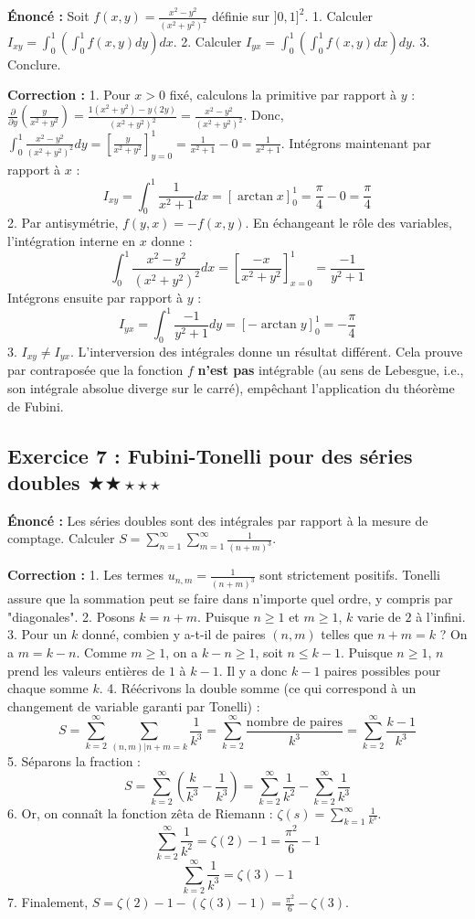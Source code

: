 \documentclass[11pt,a4paper]{article}
\begin{document}
\textbf{Énoncé :}
Soit $f(x, y) = \frac{x^2 - y^2}{(x^2 + y^2)^2}$ définie sur $]0, 1]^2$.
1. Calculer $I_{xy} = \int_0^1 \left( \int_0^1 f(x, y) dy \right) dx$.
2. Calculer $I_{yx} = \int_0^1 \left( \int_0^1 f(x, y) dx \right) dy$.
3. Conclure.

\textbf{Correction :}
1. Pour $x > 0$ fixé, calculons la primitive par rapport \`a $y$ : $\frac{\partial}{\partial y} \left( \frac{y}{x^2+y^2} \right) = \frac{1(x^2+y^2) - y(2y)}{(x^2+y^2)^2} = \frac{x^2-y^2}{(x^2+y^2)^2}$.
   Donc, $\int_0^1 \frac{x^2-y^2}{(x^2+y^2)^2} dy = \left[ \frac{y}{x^2+y^2} \right]_{y=0}^1 = \frac{1}{x^2+1} - 0 = \frac{1}{x^2+1}$.
   Intégrons maintenant par rapport \`a $x$ :
   $$ I_{xy} = \int_0^1 \frac{1}{x^2+1} dx = [\arctan x]_0^1 = \frac{\pi}{4} - 0 = \frac{\pi}{4} $$
2. Par antisymétrie, $f(y, x) = -f(x, y)$. En échangeant le rôle des variables, l'intégration interne en $x$ donne :
   $$ \int_0^1 \frac{x^2-y^2}{(x^2+y^2)^2} dx = \left[ \frac{-x}{x^2+y^2} \right]_{x=0}^1 = \frac{-1}{y^2+1} $$
   Intégrons ensuite par rapport \`a $y$ :
   $$ I_{yx} = \int_0^1 \frac{-1}{y^2+1} dy = [-\arctan y]_0^1 = -\frac{\pi}{4} $$
3. $I_{xy} \neq I_{yx}$. L'interversion des intégrales donne un résultat différent. Cela prouve par contraposée que la fonction $f$ \textbf{n'est pas} intégrable (au sens de Lebesgue, i.e., son intégrale absolue diverge sur le carré), empêchant l'application du théorème de Fubini.


\subsection*{Exercice 7 : Fubini-Tonelli pour des séries doubles \quad $\bigstar\bigstar\star\star\star$}

\textbf{Énoncé :}
Les séries doubles sont des intégrales par rapport \`a la mesure de comptage.
Calculer $S = \sum_{n=1}^\infty \sum_{m=1}^\infty \frac{1}{(n+m)^3}$.

\textbf{Correction :}
1. Les termes $u_{n,m} = \frac{1}{(n+m)^3}$ sont strictement positifs. Tonelli assure que la sommation peut se faire dans n'importe quel ordre, y compris par "diagonales".
2. Posons $k = n + m$. Puisque $n \ge 1$ et $m \ge 1$, $k$ varie de $2$ \`a l'infini.
3. Pour un $k$ donné, combien y a-t-il de paires $(n, m)$ telles que $n+m = k$ ?
   On a $m = k - n$. Comme $m \ge 1$, on a $k - n \ge 1$, soit $n \le k - 1$.
   Puisque $n \ge 1$, $n$ prend les valeurs entières de $1$ \`a $k-1$.
   Il y a donc $k - 1$ paires possibles pour chaque somme $k$.
4. Réécrivons la double somme (ce qui correspond \`a un changement de variable garanti par Tonelli) :
   $$ S = \sum_{k=2}^\infty \sum_{(n,m) | n+m=k} \frac{1}{k^3} = \sum_{k=2}^\infty \frac{\text{nombre de paires}}{k^3} = \sum_{k=2}^\infty \frac{k-1}{k^3} $$
5. Séparons la fraction :
   $$ S = \sum_{k=2}^\infty \left( \frac{k}{k^3} - \frac{1}{k^3} \right) = \sum_{k=2}^\infty \frac{1}{k^2} - \sum_{k=2}^\infty \frac{1}{k^3} $$
6. Or, on connaît la fonction zêta de Riemann : $\zeta(s) = \sum_{k=1}^\infty \frac{1}{k^s}$.
   $$ \sum_{k=2}^\infty \frac{1}{k^2} = \zeta(2) - 1 = \frac{\pi^2}{6} - 1 $$
   $$ \sum_{k=2}^\infty \frac{1}{k^3} = \zeta(3) - 1 $$
7. Finalement, $S = \zeta(2) - 1 - (\zeta(3) - 1) = \frac{\pi^2}{6} - \zeta(3)$.
\end{document}
